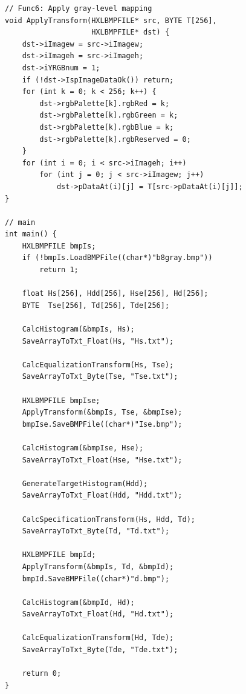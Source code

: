 \documentclass[a4paper,zihao=5]{ctexart}
\begin{document}
\begin{lstlisting}
// Func6: Apply gray-level mapping
void ApplyTransform(HXLBMPFILE* src, BYTE T[256],
                    HXLBMPFILE* dst) {
    dst->iImagew = src->iImagew;
    dst->iImageh = src->iImageh;
    dst->iYRGBnum = 1;
    if (!dst->IspImageDataOk()) return;
    for (int k = 0; k < 256; k++) {
        dst->rgbPalette[k].rgbRed = k;
        dst->rgbPalette[k].rgbGreen = k;
        dst->rgbPalette[k].rgbBlue = k;
        dst->rgbPalette[k].rgbReserved = 0;
    }
    for (int i = 0; i < src->iImageh; i++)
        for (int j = 0; j < src->iImagew; j++)
            dst->pDataAt(i)[j] = T[src->pDataAt(i)[j]];
}

// main
int main() {
    HXLBMPFILE bmpIs;
    if (!bmpIs.LoadBMPFile((char*)"b8gray.bmp"))
        return 1;

    float Hs[256], Hdd[256], Hse[256], Hd[256];
    BYTE  Tse[256], Td[256], Tde[256];

    CalcHistogram(&bmpIs, Hs);
    SaveArrayToTxt_Float(Hs, "Hs.txt");

    CalcEqualizationTransform(Hs, Tse);
    SaveArrayToTxt_Byte(Tse, "Tse.txt");

    HXLBMPFILE bmpIse;
    ApplyTransform(&bmpIs, Tse, &bmpIse);
    bmpIse.SaveBMPFile((char*)"Ise.bmp");

    CalcHistogram(&bmpIse, Hse);
    SaveArrayToTxt_Float(Hse, "Hse.txt");

    GenerateTargetHistogram(Hdd);
    SaveArrayToTxt_Float(Hdd, "Hdd.txt");

    CalcSpecificationTransform(Hs, Hdd, Td);
    SaveArrayToTxt_Byte(Td, "Td.txt");

    HXLBMPFILE bmpId;
    ApplyTransform(&bmpIs, Td, &bmpId);
    bmpId.SaveBMPFile((char*)"d.bmp");

    CalcHistogram(&bmpId, Hd);
    SaveArrayToTxt_Float(Hd, "Hd.txt");

    CalcEqualizationTransform(Hd, Tde);
    SaveArrayToTxt_Byte(Tde, "Tde.txt");

    return 0;
}
\end{lstlisting}
\end{document}

